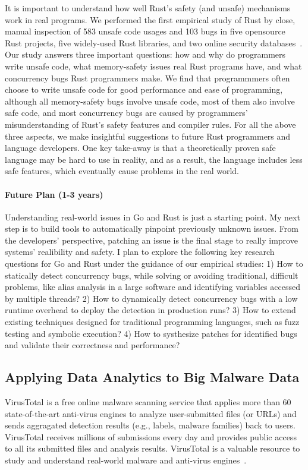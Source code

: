\documentclass[10pt]{article}
\begin{document}
It is important to understand how well Rust’s safety (and
unsafe) mechanisms work in real programs. We performed
the first empirical study of Rust by close, manual inspection of 583 unsafe code usages 
and 103 bugs in five opensource Rust projects, five widely-used Rust libraries, and two
online security databases~\cite{sosp-boqin,yu2019fearless}. Our study answers three important 
questions: how and why do programmers write unsafe
code, what memory-safety issues real Rust programs have,
and what concurrency bugs Rust programmers make. 
We find that programmmers often choose to write unsafe code for good performance 
and ease of programming, although all memory-safety bugs involve unsafe code, 
most of them also involve safe code, and 
most concurrency bugs are caused by programmers' misunderstanding of Rust's safety features 
and compiler rules. 
For all the above three aspects, we make insightful suggestions 
to future Rust programmers and language developers. 
One key take-away is that a theoretically proven safe language may be hard to 
use in reality, and as a result, the language includes less safe features, which eventually cause
problems in the real world.

\vspace{-.1in}
\paragraph{Future Plan (1-3 years)}
Understanding real-world issues in Go and Rust is just a starting point.
My next step is to build tools to automatically pinpoint previously unknown issues. 
From the developers' perspective, patching an issue is the final 
stage to really improve systems' realibility and safety. 
I plan to explore the following key research questions for Go and Rust 
under the guidance of our empirical studies: 
1) How to statically detect concurrency bugs, 
while solving or avoiding traditional, difficult problems, 
like alias analysis in a large software
and identifying variables accessed by multiple threads?
2) How to dynamically detect concurrency bugs with a low 
runtime overhead to deploy the detection in production runs?
3) How to extend existing techniques designed for traditional programming languages, 
such as fuzz testing and symbolic execution?
4) How to systhesize patches for identified bugs and validate 
their correctness and performance?

\vspace{-.1in}
\subsection{Applying Data Analytics to Big Malware Data}
VirusTotal is a free online malware scanning service that applies 
more than 60 state-of-the-art anti-virus engines to analyze user-submitted files (or URLs)
and sends aggragated detection results (e.g., labels, malware families) back to users. 
VirusTotal receives millions of submissions every day and 
provides public access to all 
its submitted files and analysis results.
VirusTotal is a valuable resource to study and understand real-world malware 
and anti-virus engines~\cite{Song16ApSys}.  
\end{document}
